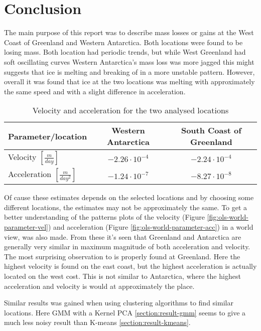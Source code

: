 \section{Conclusion}

The main purpose of this report was to describe mass losses or gains at the West Coast of Greenland and Western Antarctica.
Both locations were found to be losing mass.
Both location had periodic trends, but while West Greenland had soft oscillating curves Western Antarctica's mass loss was more jagged this might suggests that ice is melting and breaking of in a more unstable pattern.
However, overall it was found that ice at the two locations was melting with approximately the same speed and with a slight difference in acceleration.

\begin{table}[H]
\centering
\begin{tabular}[H]{l | cc}
Parameter/location & Western Antarctica  & South Coast of Greenland \\ \hline
Velocity $\left[\frac{m}{day}\right]$ &  $-2.26 \cdot 10^{-4}$ & $-2.24 \cdot 10^{-4}$ \\
Acceleration $\left[\frac{m}{day^2}\right]$ &  $-1.24 \cdot 10^{-7}$ & $-8.27 \cdot 10^{-8}$ \\
\end{tabular}
\caption{Velocity and acceleration for the two analysed locations}
\end{table}

Of cause these estimates depends on the selected locations and by choosing some different locations, the estimates may not be approximately the same.
To get a better understanding of the patterns plots of the velocity (Figure \ref{fig:ols-world-parameter-vel}) and acceleration (Figure \ref{fig:ols-world-parameter-acc}) in a world view, was also made.
From these it's seen that Greenland and Antarctica are generally very similar in maximum magnitude of both acceleration and velocity. The most surprising observation to is properly found at Greenland. Here the highest velocity is found on the east coast, but the highest acceleration is actually located on the west cost. This is not similar to Antarctica, where the highest acceleration and velocity is would at approximately the place.

Similar results was gained when using clustering algorithms to find similar locations. Here GMM with a Kernel PCA \ref{section:result-gmm} seems to give a much less noisy result than K-means \ref{section:result-kmeans}.

